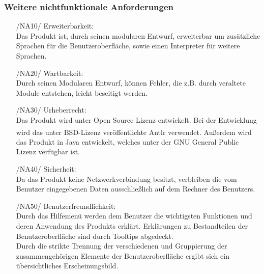 \documentclass[parskip=full]{scrartcl}
\begin{document}
		\subsubsection{Weitere nichtfunktionale Anforderungen}
		\begin{itemize}
		\item[/NA10/]Erweiterbarkeit: \\
		Das Produkt ist, durch seinen modularen Entwurf, erweiterbar um zusätzliche Sprachen für die Benutzeroberfläche, sowie einen Interpreter für weitere Sprachen.
		\item[/NA20/]Wartbarkeit: \\
		Durch seinen Modularen Entwurf, können Fehler, die z.B. durch veraltete Module entstehen, leicht beseitigt werden.
		\item[/NA30/]Urheberrecht: \\
		Das Produkt wird unter Open Source Lizenz entwickelt. Bei der Entwicklung wird das unter BSD-Lizenz veröffentlichte Antlr\textsuperscript{\textcopyright} verwendet.
		Außerdem wird das Produkt in Java entwickelt, welches unter der GNU General Public Lizenz verfügbar ist.
		\item[/NA40/] Sicherheit: \\
		Da das Produkt keine Netzwerkverbindung besitzt, verbleiben die vom Benutzer eingegebenen Daten ausschließlich auf dem Rechner des Benutzers.
		\item[/NA50/]Benutzerfreundlichkeit: \\
		Durch das Hilfemenü werden dem Benutzer die wichtigsten Funktionen und deren Anwendung des Produkts erklärt. Erklärungen zu Bestandteilen der Benutzeroberfläche sind durch \glspl{Tooltip} abgedeckt. \\
		Durch die strikte Trennung der verschiedenen und Gruppierung der zusammengehörigen Elemente der Benutzeroberfläche ergibt sich ein übersichtliches Erscheinungsbild. 
		\end{itemize}
		
\end{document}
